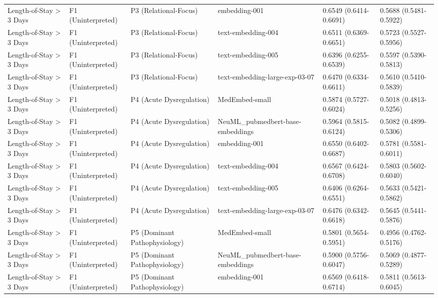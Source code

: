 \begin{tabular}{llllll}
Length-of-Stay \textgreater{} 3 Days & F1 (Uninterpreted) & P3 (Relational-Focus) & embedding-001 & 0.6549 (0.6414-0.6691) & 0.5688 (0.5481-0.5922) \\
Length-of-Stay \textgreater{} 3 Days & F1 (Uninterpreted) & P3 (Relational-Focus) & text-embedding-004 & 0.6511 (0.6369-0.6651) & 0.5723 (0.5527-0.5956) \\
Length-of-Stay \textgreater{} 3 Days & F1 (Uninterpreted) & P3 (Relational-Focus) & text-embedding-005 & 0.6396 (0.6255-0.6539) & 0.5597 (0.5390-0.5813) \\
Length-of-Stay \textgreater{} 3 Days & F1 (Uninterpreted) & P3 (Relational-Focus) & text-embedding-large-exp-03-07 & 0.6470 (0.6334-0.6611) & 0.5610 (0.5410-0.5839) \\
Length-of-Stay \textgreater{} 3 Days & F1 (Uninterpreted) & P4 (Acute Dysregulation) & MedEmbed-small & 0.5874 (0.5727-0.6024) & 0.5018 (0.4813-0.5256) \\
Length-of-Stay \textgreater{} 3 Days & F1 (Uninterpreted) & P4 (Acute Dysregulation) & NeuML\_pubmedbert-base-embeddings & 0.5964 (0.5815-0.6124) & 0.5082 (0.4899-0.5306) \\
Length-of-Stay \textgreater{} 3 Days & F1 (Uninterpreted) & P4 (Acute Dysregulation) & embedding-001 & 0.6550 (0.6402-0.6687) & 0.5781 (0.5581-0.6011) \\
Length-of-Stay \textgreater{} 3 Days & F1 (Uninterpreted) & P4 (Acute Dysregulation) & text-embedding-004 & 0.6567 (0.6424-0.6708) & 0.5803 (0.5602-0.6040) \\
Length-of-Stay \textgreater{} 3 Days & F1 (Uninterpreted) & P4 (Acute Dysregulation) & text-embedding-005 & 0.6406 (0.6264-0.6551) & 0.5633 (0.5421-0.5862) \\
Length-of-Stay \textgreater{} 3 Days & F1 (Uninterpreted) & P4 (Acute Dysregulation) & text-embedding-large-exp-03-07 & 0.6476 (0.6342-0.6618) & 0.5645 (0.5441-0.5876) \\
Length-of-Stay \textgreater{} 3 Days & F1 (Uninterpreted) & P5 (Dominant Pathophysiology) & MedEmbed-small & 0.5801 (0.5654-0.5951) & 0.4956 (0.4762-0.5176) \\
Length-of-Stay \textgreater{} 3 Days & F1 (Uninterpreted) & P5 (Dominant Pathophysiology) & NeuML\_pubmedbert-base-embeddings & 0.5900 (0.5756-0.6047) & 0.5069 (0.4877-0.5289) \\
Length-of-Stay \textgreater{} 3 Days & F1 (Uninterpreted) & P5 (Dominant Pathophysiology) & embedding-001 & 0.6569 (0.6418-0.6714) & 0.5811 (0.5613-0.6045) \\

\end{tabular}
